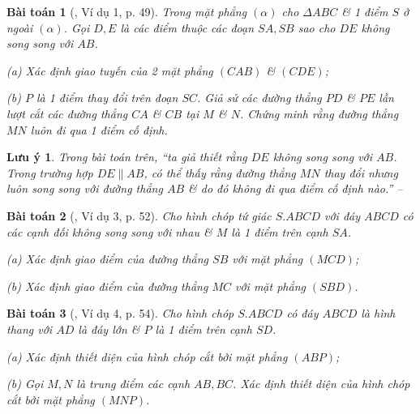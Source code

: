 \documentclass{article}
\numberwithin{equation}{section}
\newtheorem{baitoan}{Bài toán}[section]
\newtheorem{luuy}{Lưu ý}[section]
\begin{document}
\begin{baitoan}[\cite{TL_chuyen_Toan_Hinh_Hoc_11}, Ví dụ 1, p. 49]
	Trong mặt phẳng $(\alpha)$ cho $\Delta ABC$ \& 1 điểm $S$ ở ngoài $(\alpha)$. Gọi $D,E$ là các điểm thuộc các đoạn $SA,SB$ sao cho $DE$ không song song với $AB$.
	\begin{enumerate*}
		\item[(a)] Xác định giao tuyến của 2 mặt phẳng $(CAB)$ \& $(CDE)$;
		\item[(b)] $P$ là 1 điểm thay đổi trên đoạn $SC$. Giả sử các đường thẳng $PD$ \& $PE$ lần lượt cắt các đường thẳng $CA$ \& $CB$ tại $M$ \& $N$. Chứng minh rằng đường thẳng $MN$ luôn đi qua 1 điểm cố định.
	\end{enumerate*}
\end{baitoan}

\begin{luuy}
	Trong bài toán trên, ``ta giả thiết rằng $DE$ không song song với $AB$. Trong trường hợp $DE\parallel AB$, có thể thấy rằng đường thẳng $MN$ thay đổi nhưng luôn song song với đường thẳng $AB$ \& do đó không đi qua điểm cố định nào.'' -- \cite[p. 51]{TL_chuyen_Toan_Hinh_Hoc_11}
\end{luuy}

\begin{baitoan}[\cite{TL_chuyen_Toan_Hinh_Hoc_11}, Ví dụ 3, p. 52]
	Cho hình chóp tứ giác $S.ABCD$ với đáy $ABCD$ có các cạnh đối không song song với nhau \& $M$ là 1 điểm trên cạnh $SA$.
	\begin{enumerate*}
		\item[(a)] Xác định giao điểm của đường thẳng $SB$ với mặt phẳng $(MCD)$;
		\item[(b)] Xác định giao điểm của đường thẳng $MC$ với mặt phẳng $(SBD)$.
	\end{enumerate*}
\end{baitoan}

\begin{baitoan}[\cite{TL_chuyen_Toan_Hinh_Hoc_11}, Ví dụ 4, p. 54]
	Cho hình chóp $S.ABCD$ có đáy $ABCD$ là hình thang với $AD$ là đáy lớn \& $P$ là 1 điểm trên cạnh $SD$.
	\begin{enumerate*}
		\item[(a)] Xác định thiết diện của hình chóp cắt bởi mặt phẳng $(ABP)$;
		\item[(b)] Gọi $M,N$ là trung điểm các cạnh $AB,BC$. Xác định thiết diện của hình chóp cắt bởi mặt phẳng $(MNP)$.
	\end{enumerate*}
\end{baitoan}
\end{document}
